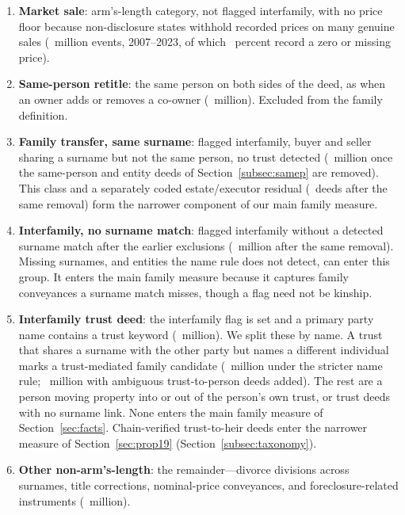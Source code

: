 \begin{enumerate}
  \item \textbf{Market sale}: arm's-length category, not flagged
        interfamily, with no price floor because non-disclosure states
        withhold recorded prices on many genuine sales (\SIIIClassMarketM\ million events,
        2007--2023, of which \SIIIMarketZeroPrice\ percent record a zero or missing price).
  \item \textbf{Same-person retitle}: the same person on both sides of the deed,
        as when an owner adds or removes a co-owner (\SIIIClassRetitleM\ million). Excluded from the family definition.
  \item \textbf{Family transfer, same surname}: flagged interfamily, buyer
        and seller sharing a surname but not the same person, no trust
        detected (\SIIIClassPersonMainM\ million once the same-person and entity deeds of
        Section~\ref{subsec:samep} are removed). This class and a separately coded estate/executor residual
        (\SIIIClassEstateMain\ deeds after the same removal) form the narrower component of our main family measure.
  \item \textbf{Interfamily, no surname match}: flagged interfamily
        without a detected surname match after the earlier exclusions
        (\SIIIClassOtherMainM\ million after the same removal). Missing surnames, and entities the name rule does not detect, can enter this group. It enters the main family measure because it captures family conveyances a surname match misses, though a flag need not be kinship.
  \item \textbf{Interfamily trust deed}: the interfamily flag is set and a
        primary party name contains a trust keyword (\SIIIClassTrustM\ million). We split
        these by name. A trust that shares a surname with the other party
        but names a different individual marks a trust-mediated family
        candidate (\SIIITrustLowerM\ million under the stricter name rule; \SIIITrustUpperM\ million with ambiguous trust-to-person deeds added). The rest are a person
        moving property into or out of the person's own trust, or trust deeds
        with no surname link. None enters the main family measure of Section~\ref{sec:facts}.
        Chain-verified trust-to-heir deeds enter the narrower measure of
        Section~\ref{sec:prop19} (Section~\ref{subsec:taxonomy}).
  \item \textbf{Other non-arm's-length}: the remainder---divorce divisions
        across surnames, title corrections, nominal-price conveyances, and
        foreclosure-related instruments (\SIIIClassNonarmsM\ million).
\end{enumerate}

